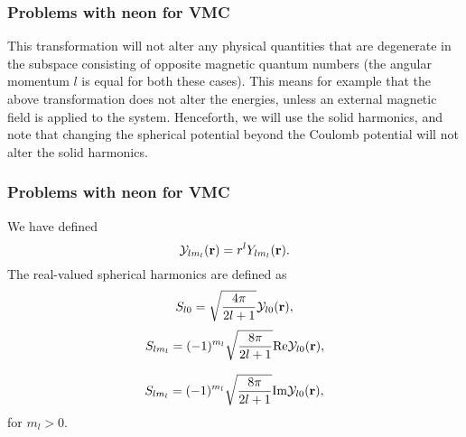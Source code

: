 \documentclass[compress]{beamer}
\begin{document}
\frame
{
  \frametitle{Problems with neon for VMC}
\begin{small}
{\scriptsize
This transformation will not alter any physical quantities that are
degenerate in the subspace consisting of opposite magnetic quantum
numbers (the angular momentum $l$ is equal for both these cases). This
means for example that the above transformation does not alter the
energies, unless an external magnetic field is applied to the
system. Henceforth, we will use the solid harmonics, and note that
changing the spherical potential beyond the Coulomb potential will not
alter the solid harmonics.
}
\end{small}
}



\frame
{
  \frametitle{Problems with neon for VMC}
\begin{small}
{\scriptsize
We have defined 
\begin{equation*}
  {\cal Y}_{lm_l}(\mathbf{r}) = r^l Y_{lm_l}(\mathbf{r}).
\end{equation*}
The real-valued spherical harmonics are defined as
\[
S_{l0} =  \sqrt{\frac{4\pi}{2l+1}} {\cal Y}_{l0}(\mathbf{r}),
\]
\[
S_{lm_l} =  (-1)^{m_l}\sqrt{\frac{8\pi}{2l+1}} \mathrm{Re}{\cal Y}_{l0}(\mathbf{r}),
\]

\[
S_{lm_l} =  (-1)^{m_l}\sqrt{\frac{8\pi}{2l+1}} \mathrm{Im}{\cal Y}_{l0}(\mathbf{r}),
\]
for $m_l> 0$.

}
\end{small}
}
\end{document}
